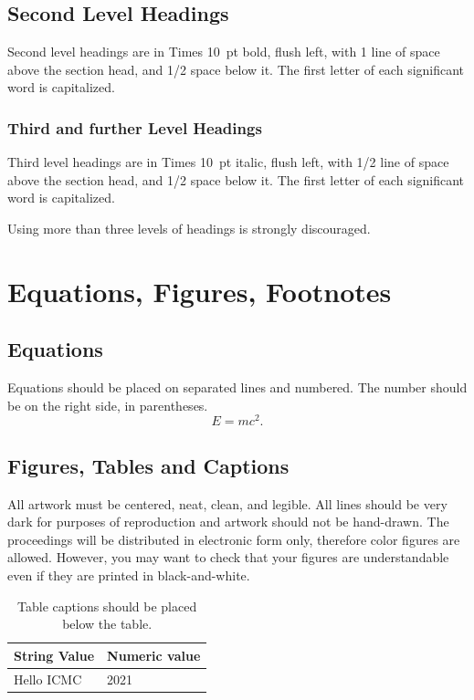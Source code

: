 \documentclass{article}
\begin{document}
\subsection{Second Level Headings}
Second level headings are in Times 10~pt bold, flush left,
with 1 line of space above the section head, and 1/2 space below it.
The first letter of each significant word is capitalized.

\subsubsection{Third and further Level Headings}
Third level headings are in Times 10~pt italic, flush left, with 1/2 line of space above the section head, and 1/2 space below it. The first letter of each significant word is capitalized.

Using more than three levels of headings is strongly discouraged.

\pagebreak

\section{Equations, Figures, Footnotes}

\subsection{Equations}
Equations should be placed on separated lines and numbered.
The number should be on the right side, in parentheses.
\begin{equation}
E=mc^{2}.
\label{eq:Emc2}
\end{equation}

\subsection{Figures, Tables and Captions}
All artwork must be centered, neat, clean, and legible. All lines should be very dark for purposes of reproduction and artwork should not be hand-drawn. The proceedings will be distributed in electronic form only, therefore color figures are allowed. However, you may want to check that your figures are understandable even if they are printed in black-and-white.
\begin{table}[h]
 \begin{center}
 \begin{tabular}{|l|l|}
  \hline
  String Value & Numeric value \\
  \hline
  Hello ICMC & 2021 \\
  \hline
 \end{tabular}
\end{center}
 \caption{Table captions should be placed below the table.}
 \label{tab:example}
\end{table}
\end{document}
